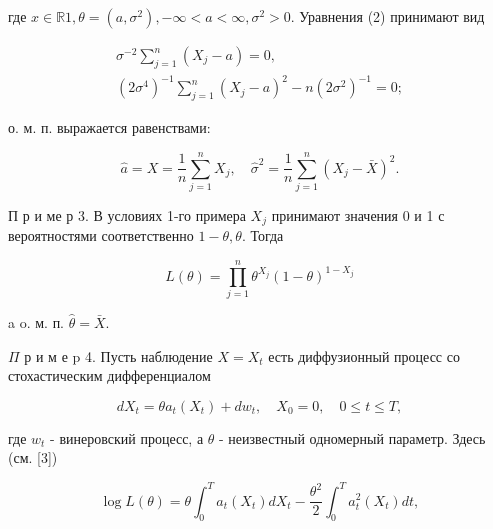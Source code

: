 \documentclass[10pt]{article}
\begin{document}
где $x \in \mathbb{R} 1, \theta=\left(a, \sigma^{2}\right),-\infty<a<\infty, \sigma^{2}>0$. Уравнения (2) принимают вид



\[

\begin{gathered}

\sigma^{-2} \sum_{j=1}^{n}\left(X_{j}-a\right)=0, \\

\left(2 \sigma^{4}\right)^{-1} \sum_{j=1}^{n}\left(X_{j}-a\right)^{2}-n\left(2 \sigma^{2}\right)^{-1}=0 ;

\end{gathered}

\]



о. м. п. выражается равенствами:



\[

\hat{a}=X=\frac{1}{n} \sum_{j=1}^{n} X_{j}, \quad \hat{\sigma}^{2}=\frac{1}{n} \sum_{j=1}^{n}\left(X_{j}-\bar{X}\right)^{2} .

\]



П р и ме р 3. В условиях 1-го примера $X_{j}$ принимают значения 0 и 1 с вероятностями соответственно $1-\theta, \theta$. Тогда



\[

L(\theta)=\prod_{j=1}^{n} \theta^{X_{j}}(1-\theta)^{1-X_{j}}

\]



a o. м. п. $\hat{\theta}=\bar{X}$.



$\Pi$ р и м е p 4. Пусть наблюдение $X=X_{t}$ есть диффузионный процесс со стохастическим дифференциалом



\[

d X_{t}=\theta a_{t}\left(X_{t}\right)+d w_{t}, \quad X_{0}=0, \quad 0 \leqslant t \leqslant T,

\]



где $w_{t}$ - винеровский процесс, а $\theta$ - неизвестный одномерный параметр. Здесь (см. [3])



\[

\log L(\theta)=\theta \int_{0}^{T} a_{t}\left(X_{t}\right) d X_{t}-\frac{\theta^{2}}{2} \int_{0}^{T} a_{t}^{2}\left(X_{t}\right) d t,

\]
\end{document}
